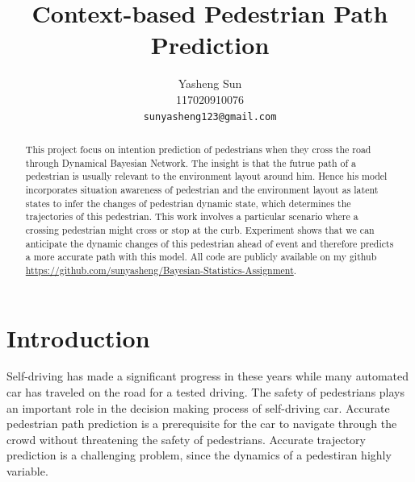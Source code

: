 \documentclass[10pt,twocolumn,letterpaper]{article}
\begin{document}
    
    \title{Context-based Pedestrian Path Prediction}
    
    \author{Yasheng Sun\\
    117020910076\\
    {\tt\small sunyasheng123@gmail.com}
    }
    
    \maketitle
    
    \begin{abstract}
    This project focus on intention prediction of pedestrians when they cross
    the road through Dynamical Bayesian Network. The insight is that 
    the futrue path of a pedestrian is usually relevant to the environment
    layout around him. Hence his model incorporates 
    situation awareness of pedestrian and the environment layout as latent 
    states to infer the changes of pedestrian dynamic state, which determines the
    trajectories of this pedestrian. This work involves
    a particular scenario where a crossing pedestrian might cross or stop at the
    curb. Experiment shows that we can anticipate the dynamic changes of this pedestrian
    ahead of event and therefore predicts a more accurate path with this model. All 
    code are publicly available on my github \url{https://github.com/sunyasheng/Bayesian-Statistics-Assignment}.

    \end{abstract}
    
    \section{Introduction}
    Self-driving has made a significant progress in these years while many automated
    car has traveled on the road for a tested driving. The safety of pedestrians 
    plays an important role in the decision making process of self-driving car. 
    Accurate pedestrian path prediction is a prerequisite for the car to navigate
    through the crowd without threatening the safety of pedestrians. Accurate trajectory
    prediction is a challenging problem, since the dynamics of a pedestiran highly variable.
\end{document}
